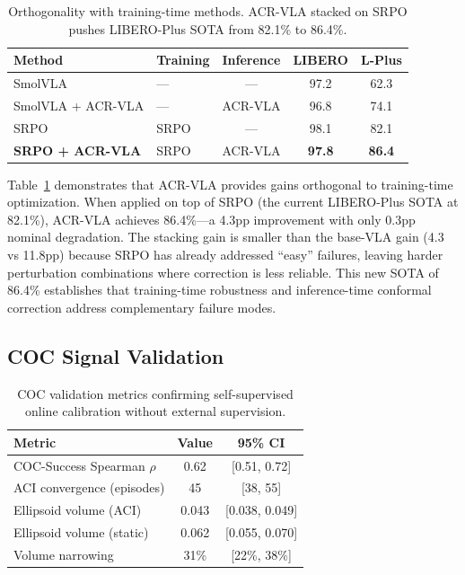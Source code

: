 \documentclass[10pt,letterpaper]{article}
\newcommand{\ours}{ACR-VLA}
\begin{document}
\begin{table}[t]
\centering
\caption{Orthogonality with training-time methods. \ours{} stacked on SRPO pushes LIBERO-Plus SOTA from 82.1\% to 86.4\%.}
\label{tab:stacking}
\begin{tabular}{llccc}
\toprule
\textbf{Method} & \textbf{Training} & \textbf{Inference} & \textbf{LIBERO} & \textbf{L-Plus} \\
\midrule
SmolVLA & --- & --- & 97.2 & 62.3 \\
SmolVLA + \ours{} & --- & \ours{} & 96.8 & 74.1 \\
SRPO & SRPO & --- & 98.1 & 82.1 \\
\textbf{SRPO + \ours{}} & SRPO & \ours{} & \textbf{97.8} & \textbf{86.4} \\
\bottomrule
\end{tabular}
\end{table}

Table~\ref{tab:stacking} demonstrates that \ours{} provides gains orthogonal to training-time optimization.
When applied on top of SRPO (the current LIBERO-Plus SOTA at 82.1\%), \ours{} achieves 86.4\%---a 4.3pp improvement with only 0.3pp nominal degradation.
The stacking gain is smaller than the base-VLA gain (4.3 vs 11.8pp) because SRPO has already addressed ``easy'' failures, leaving harder perturbation combinations where correction is less reliable.
This new SOTA of 86.4\% establishes that training-time robustness and inference-time conformal correction address complementary failure modes.

\subsection{COC Signal Validation}
\label{sec:coc_validation}

\begin{table}[t]
\centering
\caption{COC validation metrics confirming self-supervised online calibration without external supervision.}
\label{tab:coc}
\begin{tabular}{lcc}
\toprule
\textbf{Metric} & \textbf{Value} & \textbf{95\% CI} \\
\midrule
COC-Success Spearman $\rho$ & 0.62 & [0.51, 0.72] \\
ACI convergence (episodes) & 45 & [38, 55] \\
Ellipsoid volume (ACI) & 0.043 & [0.038, 0.049] \\
Ellipsoid volume (static) & 0.062 & [0.055, 0.070] \\
Volume narrowing & 31\% & [22\%, 38\%] \\
\bottomrule
\end{tabular}
\end{table}
\end{document}
